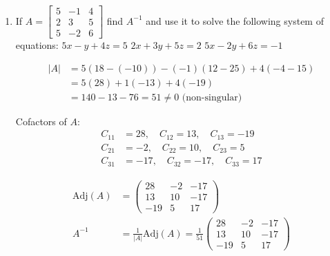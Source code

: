 \begin{enumerate}[label=\thesubsection.\arabic*, ref=\thesubsection.\theenumi]
area $\implies 7 \text{ sq. units}$

\item

If $A=[\begin{matrix}5&-1&4\\ 2&3&5\\ 5&-2&6\end{matrix}]$ find $A^{-1}$ and use it to solve the following system of equations:
$5x-y+4z=5$\newline
$2x+3y+5z=2$\newline 
$5x-2y+6z=-1$

\solution 

\begin{align*}
|A| &= 5(18 - (-10)) - (-1)(12 - 25) + 4(-4 - 15) \\
&= 5(28) + 1(-13) + 4(-19) \\
&= 140 - 13 - 76 = 51 \neq 0 \text{ (non-singular)}
\end{align*}

Cofactors of $A$:
\begin{align*}
C_{11} &= 28, \quad C_{12} = 13, \quad C_{13} = -19 \\
C_{21} &= -2, \quad C_{22} = 10, \quad C_{23} = 5 \\
C_{31} &= -17, \quad C_{32} = -17, \quad C_{33} = 17
\end{align*}

\begin{align*}
\text{Adj}(A) &= \begin{pmatrix} 28 & -2 & -17 \\ 13 & 10 & -17 \\ -19 & 5 & 17 \end{pmatrix} \\
A^{-1} &= \frac{1}{|A|} \text{Adj}(A) = \frac{1}{51} \begin{pmatrix} 28 & -2 & -17 \\ 13 & 10 & -17 \\ -19 & 5 & 17 \end{pmatrix}
\end{align*}


\end{enumerate}
